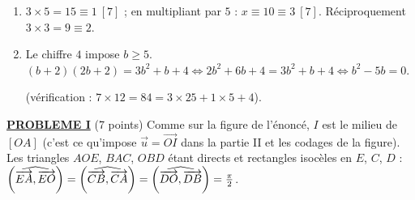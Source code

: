 \begin{description}
\begin{enumerate}
			Le produit est donc divisible par $12 \times 2 = 24$.
			\par\noindent{}
		\item {}
			$3 \times 5 = 15 \equiv 1 \ [7]$ ; en multipliant par $5$ : $x \equiv 10 \equiv 3 \ [7]$. Réciproquement $3 \times 3 = 9 \equiv 2$.
			\par\noindent{}
		\item {}
			Le chiffre $4$ impose $b \geq 5$. $(b + 2)(2b + 2) = 3b^2 + b + 4 \iff 2b^2 + 6b + 4 = 3b^2 + b + 4 \iff b^2 - 5b = 0$.
			\par\noindent{} (vérification : $7 \times 12 = 84 = 3 \times 25 + 1 \times 5 + 4$).
	\end{enumerate}
\end{description}
\noindent \underline{\textsc{\textbf{PROBLEME I}}} (7 points) \newline
Comme sur la figure de l'énoncé, $I$ est le milieu de $[OA]$ (c'est ce qu'impose $\vec{u} = \overrightarrow{OI}$ dans la partie II et les codages de la figure).
Les triangles $AOE$, $BAC$, $OBD$ étant directs et rectangles isocèles en $E$, $C$, $D$ : $\left( \widehat{ \overrightarrow{EA} , \overrightarrow{EO} } \right) = \left( \widehat{ \overrightarrow{CB} , \overrightarrow{CA} } \right) = \left( \widehat{ \overrightarrow{DO} , \overrightarrow{DB} } \right) = \frac{\pi}{2}$.
\begin{center}
\end{center}
